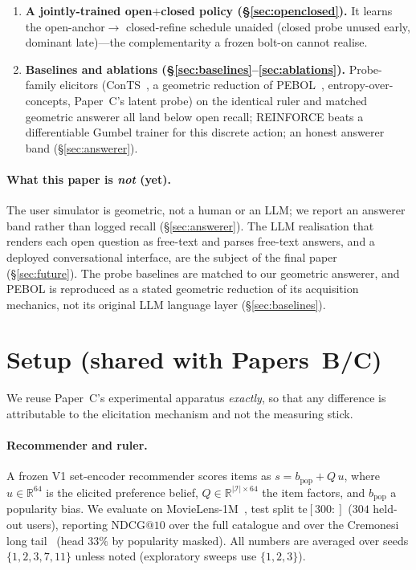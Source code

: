 \documentclass[11pt]{article}
\makeatletter
\newcommand{\R}{\mathbb{R}}
\newcommand{\ndcg}{\mathrm{NDCG@}10}
\makeatother
\begin{document}
\begin{enumerate}
  \item \textbf{A jointly-trained open$+$closed policy (\S\ref{sec:openclosed}).} It learns the open-anchor$\to$
  closed-refine schedule unaided (closed probe unused early, dominant late)---the complementarity a frozen bolt-on
  cannot realise.
  \item \textbf{Baselines and ablations (\S\ref{sec:baselines}--\ref{sec:ablations}).} Probe-family elicitors
  (ConTS~\cite{li21conts}, a geometric reduction of PEBOL~\cite{pebol}, entropy-over-concepts, Paper~C's latent probe) on the identical ruler and matched
  geometric answerer all land below open recall; REINFORCE beats a differentiable Gumbel trainer for this discrete
  action; an honest answerer band (\S\ref{sec:answerer}).
\end{enumerate}

\paragraph{What this paper is \emph{not} (yet).} The user simulator is geometric, not a human or an LLM; we report an
answerer band rather than logged recall (\S\ref{sec:answerer}). The LLM realisation that renders each open question as
free-text and parses free-text answers, and a deployed conversational interface, are the subject of the final paper
(\S\ref{sec:future}). The probe baselines are matched to our geometric answerer, and PEBOL is reproduced as a stated
geometric reduction of its acquisition mechanics, not its original LLM language layer (\S\ref{sec:baselines}).

\section{Setup (shared with Papers~B/C)}
\label{sec:setup}
We reuse Paper~C's experimental apparatus \emph{exactly}, so that any difference is attributable to the elicitation
mechanism and not the measuring stick.

\paragraph{Recommender and ruler.} A frozen V1 set-encoder recommender scores items as $s = b_{\text{pop}} + Q\,u$,
where $u\in\R^{64}$ is the elicited preference belief, $Q\in\R^{|\mathcal I|\times 64}$ the item factors, and
$b_{\text{pop}}$ a popularity bias. We evaluate on MovieLens-1M~\cite{harper15}, test split te$[300{:}]$ ($304$ held-out users),
reporting $\ndcg$ over the full catalogue and over the Cremonesi long tail~\cite{cremonesi10} (head $33\%$ by popularity masked). All
numbers are averaged over seeds $\{1,2,3,7,11\}$ unless noted (exploratory sweeps use $\{1,2,3\}$).
\end{document}
